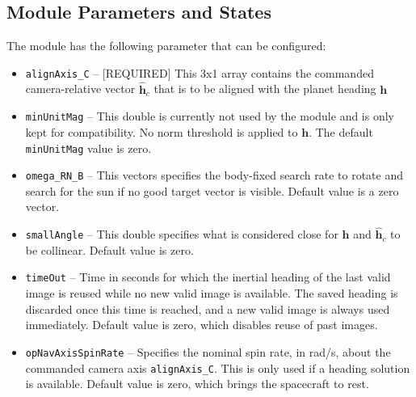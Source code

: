 \subsection{Module Parameters and States}
The module has the following parameter that can be configured:
\begin{itemize}
	\item {\tt alignAxis\_C} -- [REQUIRED] This 3x1 array contains the commanded camera-relative vector $\hat{\bm h}_{c}$ that is to be aligned with the planet heading $\bm h$

	\item {\tt minUnitMag} -- This double is currently not used by the module and is only kept for compatibility.  No norm threshold is applied to $\bm h$.  The default {\tt minUnitMag} value is zero.

	\item {\tt omega\_RN\_B} -- This vectors specifies the body-fixed search rate to rotate and search for the sun if no good target vector is visible.  Default value is a zero vector.

	\item {\tt smallAngle} -- This double specifies what is considered close for $\bm h$ and $\hat{\bm h}_{c}$ to be collinear.  Default value is zero.

	\item {\tt timeOut} -- Time in seconds for which the inertial heading of the last valid image is reused while no new valid image is available.  The saved heading is discarded once this time is reached, and a new valid image is always used immediately.  Default value is zero, which disables reuse of past images.

	\item {\tt opNavAxisSpinRate} -- Specifies the nominal spin rate, in rad/s, about the commanded camera axis {\tt alignAxis\_C}.  This is only used if a heading solution is available.  Default value is zero, which brings the spacecraft to rest.

\end{itemize}
